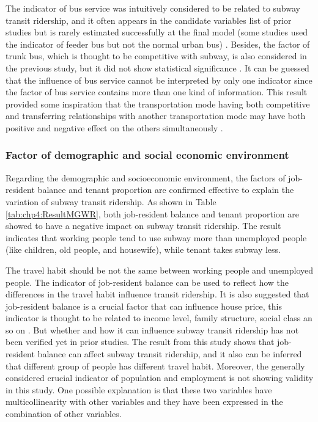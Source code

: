 %
The indicator of bus service was intuitively considered to be related to subway transit ridership, and it often appears in the candidate variables list of prior studies but is rarely estimated successfully at the final model (some studies used the indicator of feeder bus but not the normal urban bus) \cite{sohn2010factors,cardozo2012application,zhao2013influences}. Besides, the factor of trunk bus, which is thought to be competitive with subway, is also considered in the previous study, but it did not show statistical significance \cite{sohn2010factors}. It can be guessed that the influence of bus service cannot be interpreted by only one indicator since the factor of bus service contains more than one kind of information. This result provided some inspiration that the transportation mode having both competitive and transferring relationships with another transportation mode may have both positive and negative effect on the others simultaneously .

%
\subsubsection{Factor of demographic and social economic environment}
%
Regarding the demographic and socioeconomic environment, the factors of job-resident balance and tenant proportion are confirmed effective to explain the variation of subway transit ridership. As shown in Table \ref{tab:chp4:ResultMGWR}, both job-resident balance and tenant proportion are showed to have a negative impact on subway transit ridership. The result indicates that working people tend to use subway more than unemployed people (like children, old people, and housewife), while tenant takes subway less.

%
The travel habit should be not the same between working people and unemployed people. The indicator of job-resident balance can be used to reflect how the differences in the travel habit influence transit ridership. It is also suggested that job-resident balance is a crucial factor that can influence house price, this indicator is thought to be related to income level, family structure, social class an so on \cite{song2004measuring}. But whether and how it can influence subway transit ridership has not been verified yet in prior studies. The result from this study shows that job-resident balance can affect subway transit ridership, and it also can be inferred that different group of people has different travel habit. Moreover, the generally considered crucial indicator of population and employment is not showing validity in this study. One possible explanation is that these two variables have multicollinearity with other variables and they have been expressed in the combination of other variables.

